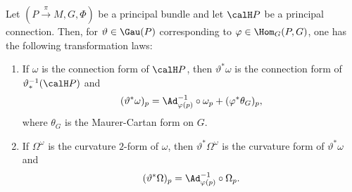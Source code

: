 \begin{prop}[{{\cite[Prop.~1.8.7]{RS2}}}]
    Let $(P\overset{\pi}{\to}M,G,\Phi)$ be a principal bundle and let $\calH P$ be a principal connection. Then, for $\vartheta\in \Gau(P)$ corresponding to $\varphi\in \Hom_G(P,G)$, one has the following transformation laws:
    \begin{enumerate}
        \item If $\omega$ is the connection form of $\calH P$, then $\vartheta^\ast \omega$ is the connection form of $\vartheta_\ast^{-1}(\calH P)$ and 
        \[(\vartheta^\ast\omega)_p=\Ad_{\varphi(p)}^{-1}\circ\omega_p+(\varphi^\ast\theta_G)_p,\label{eq 1.8.7 RS2}\]
        where $\theta_G$ is the Maurer-Cartan form on $G$.

        \item If $\Omega^\omega$ is the curvature $2$-form of $\omega$, then $\vartheta^\ast\Omega^\omega$ is the curvature form of $\vartheta^\ast\omega$ and
        \[(\vartheta^\ast\Omega)_p=\Ad_{\varphi(p)}^{-1}\circ\Omega_p.\label{eq 1.8.8 RS2}\]
    \end{enumerate}
\end{prop}
